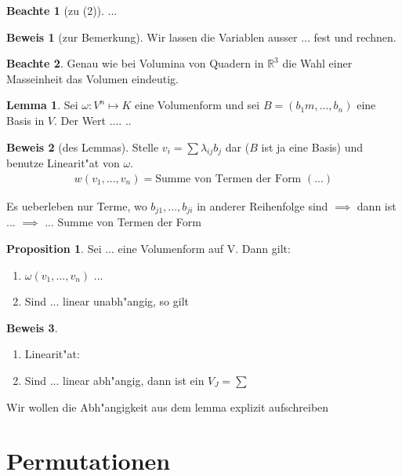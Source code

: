 \documentclass[oneside,fontsize=11pt,paper=a4,BCOR=0mm,DIV=12,automark,headsepline]{scrbook}
\theoremstyle{remark}
\theoremstyle{definition}
\newtheorem*{notte}{Beachte}
\newtheorem*{proposition}{Proposition}
\newtheorem{lemma}{Lemma}[section]
\theoremstyle{definition}
\newtheorem*{prof}{Beweis}
\theoremstyle{remark}
\begin{document}
\begin{notte}[zu (2)]
  ...
\end{notte}

\begin{prof}[zur Bemerkung]
  Wir lassen die Variablen ausser ... fest und rechnen.
\end{prof}

\begin{notte}
  Genau wie bei Volumina von Quadern in $\mathbb{R}^3$ die Wahl einer
  Masseinheit das Volumen eindeutig.
\end{notte}

\begin{lemma}
  Sei $\omega: V^n\mapsto K$ eine Volumenform und sei $B=(b_1m, ... , b_n)$
  eine Basis in $V$. Der Wert ....  ..
\end{lemma}

\begin{prof}[des Lemmas]
  Stelle $v_i=\sum{\lambda_{ij}b_j}$ dar ($B$ ist ja eine Basis) und benutze
  Linearit"at von $\omega$.
  \begin{align*}
    w(v_1, ..., v_n)=\text{Summe von Termen der Form } (...)
  \end{align*}

  Es ueberleben nur Terme, wo $b_{j1},...,b_{ji}$ in anderer Reihenfolge sind
  $\implies$ dann ist ... $\implies$ ... Summe von Termen der Form
\end{prof}
\begin{proposition}
  Sei ... eine Volumenform auf V. Dann gilt:
  \begin{enumerate}
  \item $\omega(v_1,...,v_n)$ ...
  \item Sind ... linear unabh"angig, so gilt
  \end{enumerate}
\end{proposition}

\begin{prof}
  \begin{enumerate}
  \item Linearit"at: 
  \item Sind ... linear abh"angig, dann ist ein $V_J=\sum$
  \end{enumerate}
\end{prof}

Wir wollen die Abh"angigkeit aus dem lemma explizit aufschreiben

\section{Permutationen}
\label{sec:perm}
\end{document}
